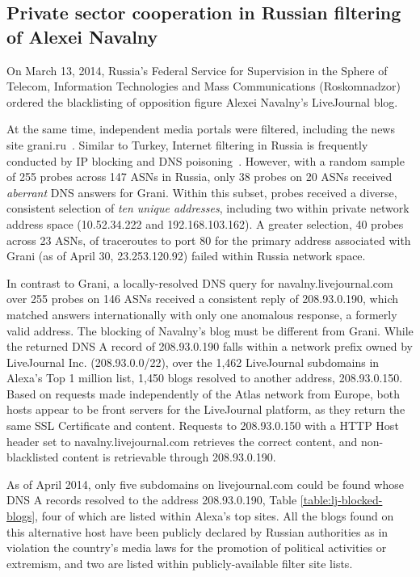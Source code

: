 \subsection{Private sector cooperation in Russian filtering of Alexei Navalny}
\label{sec:russia}

On March 13, 2014, Russia's Federal Service for Supervision in the
Sphere of Telecom, Information Technologies and Mass Communications
(Roskomnadzor) ordered the blacklisting of opposition figure Alexei
Navalny's LiveJournal blog.

At the same time, independent media portals were filtered, including the
news site grani.ru~\cite{ibtimes2014russia}.  Similar to Turkey,
Internet filtering in Russia is frequently conducted by IP blocking and
DNS poisoning~\cite{rugovdns,verkamp2012inferring}.  However, with a
random sample of 255 probes across 147 ASNs in Russia, only 38 probes on
20 ASNs received \emph{aberrant} DNS answers for Grani. Within this subset,
probes received a diverse, consistent selection of \emph{ten unique
addresses}, including two within private network address space
(10.52.34.222 and 192.168.103.162). A greater selection, 40 probes
across 23 ASNs, of traceroutes to port 80 for the primary address
associated with Grani (as of April 30, 23.253.120.92) failed within
Russia network space. 

In contrast to Grani, a locally-resolved DNS query for
navalny.livejournal.com over 255 probes on 146 ASNs received a
consistent reply of 208.93.0.190, which matched answers internationally
with only one anomalous response, a formerly valid address. The blocking
of Navalny's blog must be different from Grani. While the returned DNS A
record of 208.93.0.190 falls within a network prefix owned by
LiveJournal Inc. (208.93.0.0/22), over the 1,462 LiveJournal subdomains
in Alexa's Top 1 million list, 1,450 blogs resolved to another address,
208.93.0.150. Based on requests made independently of the Atlas network
from Europe, both hosts appear to be front servers for the LiveJournal
platform, as they return the same SSL Certificate and content. Requests
to 208.93.0.150 with a HTTP Host header set to navalny.livejournal.com
retrieves the correct content, and non-blacklisted content is
retrievable through 208.93.0.190.

As of April 2014, only five subdomains on livejournal.com could be found
whose DNS A records resolved to the address 208.93.0.190, Table
\ref{table:lj-blocked-blogs}, four of which are listed within Alexa's
top sites. All the blogs found on this alternative host have been
publicly declared by Russian authorities as in violation the country's
media laws for the promotion of political activities or extremism, and
two are listed within publicly-available filter site lists. 

